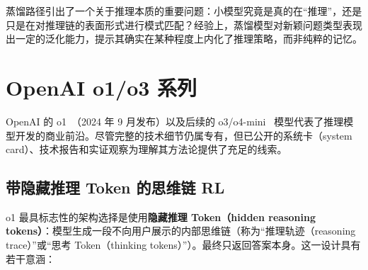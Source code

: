 蒸馏路径引出了一个关于推理本质的重要问题：小模型究竟是真的在“推理”，还是只是在对推理链的表面形式进行模式匹配？经验上，蒸馏模型对新颖问题类型表现出一定的泛化能力，提示其确实在某种程度上内化了推理策略，而非纯粹的记忆。

\section{OpenAI o1/o3 系列}
\label{subsec:openai_o1}

OpenAI 的 o1~\cite{openai2024o1}（2024 年 9 月发布）以及后续的 o3/o4-mini~\cite{openai2025o3} 模型代表了推理模型开发的商业前沿。尽管完整的技术细节仍属专有，但已公开的系统卡（system card）、技术报告和实证观察为理解其方法论提供了充足的线索。

\subsection{带隐藏推理 Token 的思维链 RL}
\label{chain-of-thought-rl-with-hidden-reasoning-tokens}

o1 最具标志性的架构选择是使用\textbf{隐藏推理 Token（hidden reasoning tokens）}：模型生成一段不向用户展示的内部思维链（称为“推理轨迹（reasoning trace）”或“思考 Token（thinking tokens）”）。最终只返回答案本身。这一设计具有若干意涵：

